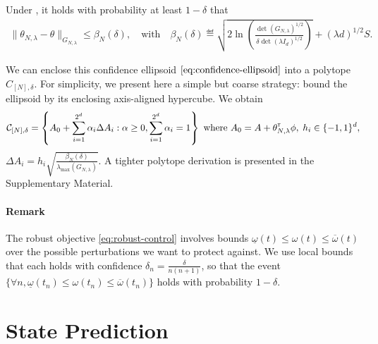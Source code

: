 \documentclass{article}
\begin{document}
\begin{theorem}
\label{thm:confidence_ellipsoid}
Under , it holds with probability at least $1-\delta$ that
\begin{align}
    \label{eq:confidence-ellipsoid}
    \| \theta_{N,\lambda}  - \theta\|_{G_{N,\lambda}} \leq \beta_N(\delta), \quad \text{with}\quad
    \beta_N(\delta)\eqdef \sqrt{2\ln \left(\frac{\det(G_{N,\lambda})^{1/2}}{\delta\det(\lambda I_d)^{1/2}}\right)}
     + (\lambda d)^{1/2}S.
\end{align}
\end{theorem}

We can enclose this confidence ellipsoid $\eqref{eq:confidence-ellipsoid}$ into a polytope $C_{[N],\delta}$. For simplicity, we present here a simple but coarse strategy: bound the ellipsoid by its enclosing axis-aligned hypercube. We obtain
\begin{align}
    \label{eq:polytope}
     \mathcal{C}_{[N],\delta} = \left\{ A_0 +\sum_{i=1}^{2^d}\alpha_{i}\Delta A_{i}: \alpha\geq 0,  \sum_{i=1}^{2^d}\alpha_{i}=1\right\} \text{ where } A_0 = A + \theta_{N,\lambda}^{\mathsf{\scriptscriptstyle T}}\phi,\; h_i\in\{-1,1\}^d,
\end{align}
$\Delta A_{i} = {h_i} \sqrt{\frac{\beta_N(\delta)}{\lambda_{\max}(G_{N,\lambda})}}$. A tighter polytope derivation is presented in the Supplementary Material. %

\paragraph{Remark} The robust objective \eqref{eq:robust-control} involves bounds $\underline{\omega}(t)\leq \omega(t) \leq \overline{\omega}(t)$ over the possible perturbations we want to protect against. We use local bounds that each holds with confidence $\delta_n = \frac{\delta}{n(n+1)}$, so that the event $\{\forall n, \underline{\omega}(t_n) \leq \omega(t_n) \leq \overline{\omega}(t_n)\}$ holds with probability $1-\delta$.

\section{State Prediction}

\label{sec:prediction}
\end{document}
